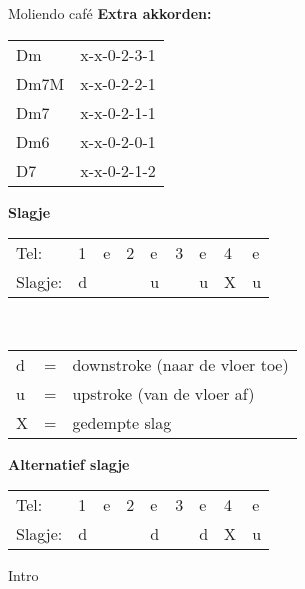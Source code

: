 \begin{song}[tropical]{Moliendo café}
\textbf{Extra akkorden:}\\
\begin{tabular}{ll}
Dm & x-x-0-2-3-1 \\ 
Dm7M &  x-x-0-2-2-1 \\ 
Dm7 & x-x-0-2-1-1 \\ 
Dm6 &  x-x-0-2-0-1 \\ 
D7 & x-x-0-2-1-2 \\ 
\end{tabular} 

\textbf{Slagje}\\
\begin{tabular}{lllllllll}
Tel:&1 & e & 2 & e & 3 & e & 4 & e \\ 
Slagje:&d &  &  & u &  & u & X & u \\ 
\end{tabular}\\
\begin{tabular}{lcl}
 d & = & downstroke (naar de vloer toe) \\ 
 u & = & upstroke (van de vloer af) \\ 
 X & = & gedempte slag \\ 
 \end{tabular}  

\textbf{Alternatief slagje}\\
\begin{tabular}{lllllllll}
Tel:&1 & e & 2 & e & 3 & e & 4 & e \\ 
Slagje:&d &  &  & d &  & d & X & u \\ 
\end{tabular}

\begin{instrumental}{Intro}
\\
\measure*{}\\
\measure{}\measure{}\measure*{}\\
\measure*{$\downarrow$}
\end{instrumental}
\vspace{-1em}


\end{song}
